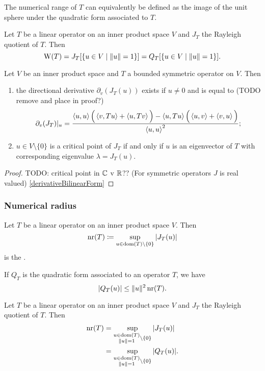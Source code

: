 The numerical range of $T$ can equivalently be defined as the image of the unit sphere under the quadratic form associated to $T$.

\begin{lemma}
Let $T$ be a linear operator on an inner product space $V$ and $J_T$ the Rayleigh quotient of $T$. Then
\[ \operatorname{W}(T) = J_T[\left\{ u\in V \;\middle|\; \lVert u\rVert = 1 \right\}] = Q_T[\left\{ u\in V \;\middle|\; \lVert u\rVert = 1 \right\}]. \]
\end{lemma}

\begin{lemma}
Let $V$ be an inner product space and $T$ a bounded symmetric operator on $V$. Then
\begin{enumerate}
\item the directional derivative $\partial_v(J_T(u))$ exists if $u\neq 0$ and is equal to (TODO remove and place in proof?)
\[ \partial_v(J_T)|_u = \frac{\left\langle u,u \right\rangle\Big( \left\langle v,Tu \right\rangle + \left\langle u,Tv \right\rangle \Big) - \left\langle u,Tu \right\rangle\Big(\left\langle u,v \right\rangle+\left\langle v,u \right\rangle\Big)}{\left\langle u,u \right\rangle^2}; \]
\item $u\in V\setminus \{ 0 \}$ is a critical point of $J_T$ \textup{if and only if} $u$ is an eigenvector of $T$ with corresponding eigenvalue $\lambda = J_T(u)$.
\end{enumerate}
\end{lemma}
\begin{proof}
TODO: critical point in $\mathbb{C}$ v $\mathbb{R}$?? (For symmetric operators $J$ is real valued)
\ref{derivativeBilinearForm}
\end{proof}

\subsubsection{Numerical radius}
\begin{definition}
Let $T$ be a linear operator on an inner product space $V$. Then
\[ \operatorname{nr}(T) \coloneqq \sup_{u\in \operatorname{dom}(T)\setminus\{0\}} |J_T(u)| \]
is the .
\end{definition}
If $Q_T$ is the quadratic form associated to an operator $T$, we have
\[ |Q_T(u)| \leq \lVert u\rVert^2\operatorname{nr}(T). \]

\begin{lemma}
Let $T$ be a linear operator on an inner product space $V$ and $J_T$ the Rayleigh quotient of $T$. Then
\begin{align*}
\operatorname{nr}(T) &= \sup_{\substack{u\in \operatorname{dom}(T)\\ \lVert u\rVert = 1}\setminus\{0\}} |J_T(u)| \\
&= \sup_{\substack{u\in \operatorname{dom}(T)\\ \lVert u\rVert = 1}\setminus\{0\}} |Q_T(u)|.
\end{align*}
\end{lemma}

